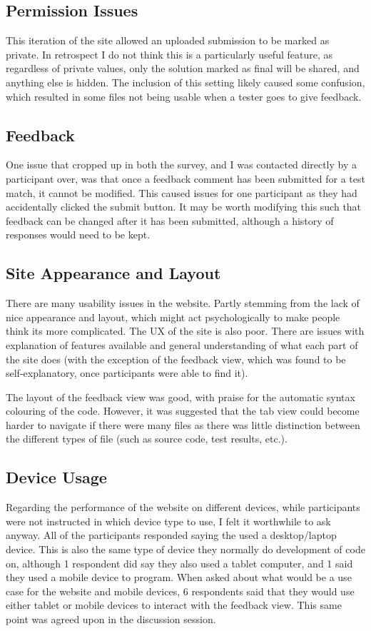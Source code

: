 \documentclass[a4paper,11pt]{report}
\begin{document}
\subsection{Permission Issues}
\label{sec:permiss}
This iteration of the site allowed an uploaded submission to be marked as private. In retrospect I do not think this is a particularly useful feature, as regardless of private values, only the solution marked as final will be shared, and anything else is hidden. The inclusion of this setting likely caused some confusion, which resulted in some files not being usable when a tester goes to give feedback.
\subsection{Feedback}
One issue that cropped up in both the survey, and I was contacted directly by a participant over, was that once a feedback comment has been submitted for a test match, it cannot be modified. This caused issues for one participant as they had accidentally clicked the submit button. It may be worth modifying this such that feedback can be changed after it has been submitted, although a history of responses would need to be kept.\par
\subsection{Site Appearance and Layout}
There are many usability issues in the website. Partly stemming from the lack of nice appearance and layout, which might act psychologically to make people think its more complicated. The UX of the site is also poor. There are issues with explanation of features available and general understanding of what each part of the site does (with the exception of the feedback view, which was found to be self-explanatory, once participants were able to find it).\par
The layout of the feedback view was good, with praise for the automatic syntax colouring of the code. However, it was suggested that the tab view could become harder to navigate if there were many files as there was little distinction between the different types of file (such as source code, test results, etc.).\par
\subsection{Device Usage}
Regarding the performance of the website on different devices, while participants were not instructed in which device type to use, I felt it worthwhile to ask anyway. All of the participants responded saying the used a desktop/laptop device. This is also the same type of device they normally do development of code on, although 1 respondent did say they also used a tablet computer, and 1 said they used a mobile device to program. When asked about what would be a use case for the website and mobile devices, 6 respondents said that they would use either tablet or mobile devices to interact with the feedback view. This same point was agreed upon in the discussion session.\par
\end{document}
